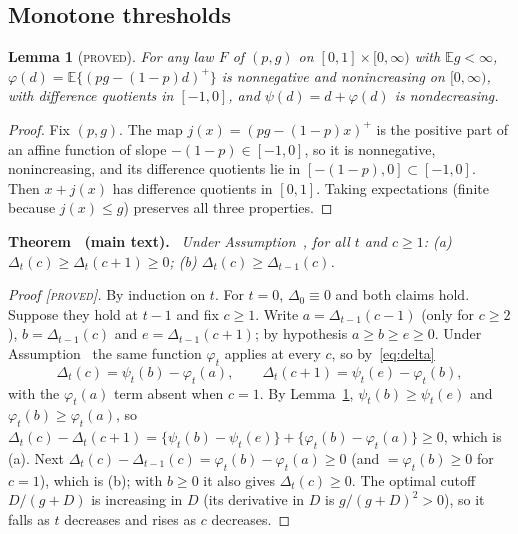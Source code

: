 \documentclass[aoas]{imsart}
\theoremstyle{plain}
\newtheorem{lemma}[theorem]{Lemma}
\theoremstyle{definition}
\newcommand{\E}{\mathbb{E}}
\newenvironment{restate}[1]{\par\medskip\noindent\textbf{#1 (main text).}\ \itshape}{\par\medskip}
\newcommand{\status}[1]{\textup{[\textsc{#1}]}}
\newcommand{\tstatus}[1]{\textup{\textsc{#1}}}
\begin{document}
\subsection{Monotone thresholds}
\begin{lemma}[\tstatus{proved}]\label{lem:phi}
For any law $F$ of $(p,g)$ on $[0,1]\times[0,\infty)$ with $\E g<\infty$, $\varphi(d)=\E\{(pg-(1-p)d)^+\}$ is
nonnegative and nonincreasing on $[0,\infty)$, with difference quotients in $[-1,0]$, and $\psi(d)=d+\varphi(d)$ is
nondecreasing.
\end{lemma}
\begin{proof}
Fix $(p,g)$. The map $j(x)=(pg-(1-p)x)^+$ is the positive part of an affine function of slope $-(1-p)\in[-1,0]$, so it
is nonnegative, nonincreasing, and its difference quotients lie in $[-(1-p),0]\subset[-1,0]$. Then $x+j(x)$ has
difference quotients in $[0,1]$. Taking expectations (finite because $j(x)\le g$) preserves all three properties.
\end{proof}

\begin{restate}{Theorem~}
Under Assumption~, for all $t$ and $c\ge1$: (a) $\Delta_t(c)\ge\Delta_t(c+1)\ge0$; (b)
$\Delta_t(c)\ge\Delta_{t-1}(c)$.
\end{restate}
\begin{proof}[Proof \status{proved}]
By induction on $t$. For $t=0$, $\Delta_0\equiv0$ and both claims hold. Suppose they hold at $t-1$ and fix $c\ge1$.
Write $a=\Delta_{t-1}(c-1)$ (only for $c\ge2$), $b=\Delta_{t-1}(c)$ and $e=\Delta_{t-1}(c+1)$; by hypothesis
$a\ge b\ge e\ge0$. Under Assumption~ the same function $\varphi_t$ applies at every $c$, so
by~\eqref{eq:delta}
\[ \Delta_t(c)=\psi_t(b)-\varphi_t(a),\qquad \Delta_t(c+1)=\psi_t(e)-\varphi_t(b), \]
with the $\varphi_t(a)$ term absent when $c=1$. By Lemma~\ref{lem:phi}, $\psi_t(b)\ge\psi_t(e)$ and
$\varphi_t(b)\ge\varphi_t(a)$, so
$\Delta_t(c)-\Delta_t(c+1)=\{\psi_t(b)-\psi_t(e)\}+\{\varphi_t(b)-\varphi_t(a)\}\ge0$, which is (a). Next
$\Delta_t(c)-\Delta_{t-1}(c)=\varphi_t(b)-\varphi_t(a)\ge0$ (and $=\varphi_t(b)\ge0$ for $c=1$), which is (b); with
$b\ge0$ it also gives $\Delta_t(c)\ge0$. The optimal cutoff $D/(g+D)$ is increasing in $D$ (its derivative in $D$ is
$g/(g+D)^2>0$), so it falls as $t$ decreases and rises as $c$ decreases.
\end{proof}
\end{document}
